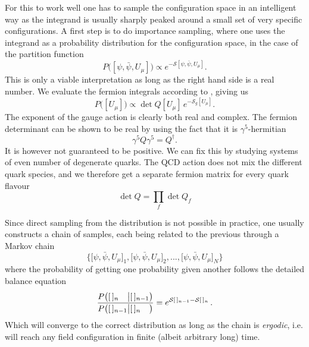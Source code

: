 For this to work well one has to sample the configuration space in an
intelligent way as the integrand is usually sharply peaked around a small set of
very specific configurations. A first step is to do importance sampling, where
one uses the integrand as a probability distribution for the configuration
space, in the case of the partition function
%
\begin{equation}
  P\big([\psi,\bar{\psi}, U_{\mu}]\big) \propto e^{-\mathcal{S}[\psi,\bar{\psi}, U_{\mu}]}.
\end{equation}
%
This is only a viable interpretation as long as the right hand side is a real
number. We evaluate the fermion integrals according to
, giving us
%
\begin{equation}
  P\big([U_{\mu}]\big) \propto \det Q[U_{\mu}] \, e^{-\mathcal{S}_g[U_{\mu}]}.
\end{equation}
%
The exponent of the gauge action is clearly both real and complex. The fermion
determinant can be shown to be real by using the fact that it is
$\gamma^5$-hermitian
%
\begin{equation}
  \gamma^5 Q \gamma^5 = Q^{\dagger}.
\end{equation}
%
It is however not guaranteed to be positive. We can fix this by studying systems
of even number of degenerate quarks. The QCD action does not mix the different
quark species, and we therefore get a separate fermion matrix for every quark
flavour
%
\begin{equation}
  \det Q = \prod_f \det Q_f
\end{equation}


Since direct sampling from the distribution is not possible in practice,
one usually constructs a chain of samples, each being related to the previous
through a Markov chain
%
\begin{equation}
  \Big\{
    \big[\psi, \bar{\psi}, U_{\mu}\big]_1, 
    \big[\psi, \bar{\psi}, U_{\mu}\big]_2, ..., 
    \big[\psi, \bar{\psi}, U_{\mu}\big]_N
  \Big\}
\end{equation}
%
where the probability of getting one probability given another follows the
detailed balance equation
%
\begin{equation}
  \frac{%
    P\big([\,]_{n\hphantom{-1}} \big| [\,]_{n-1}\big)
  }{%
    P\big([\,]_{n-1} \big| [\,]_{n\hphantom{-1}}\big)
  } = e^{\mathcal{S}[\,]_{n-1} - \mathcal{S}[\,]_n} \,.
\end{equation}
%
Which will converge to the correct distribution as long as the chain is
\emph{ergodic}, i.e. will reach any field configuration in finite (albeit
arbitrary long) time.

